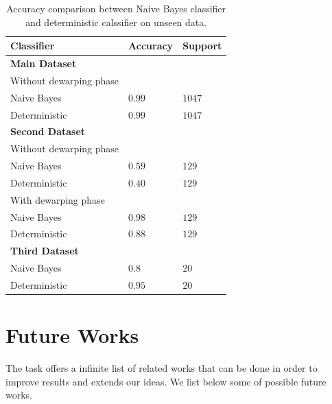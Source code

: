 \documentclass[10pt,twocolumn,letterpaper]{article}
\begin{document}
\begin{table}[!h]
  \begin{center}
    \begin{tabular}{lll}
      \hline
      Classifier & Accuracy & Support \\ \hline
      \textbf{Main Dataset} \\
      \small Without dewarping phase\\
      \; \; Naive Bayes & $0.99$ & $1047$ \\
      \; \; Deterministic & $0.99$ & $1047$ \\ \hline
      
      \textbf{Second Dataset} & & \\
      \small Without dewarping phase \\
      \; \; Naive Bayes & $0.59$ & $129$ \\
      \; \; Deterministic & $0.40$ & $129$ \\ 
      
      \small With dewarping phase \\
      \; \; Naive Bayes & $0.98$ & $129$ \\
      \; \; Deterministic & $0.88$ & $129$ \\ \hline
      
      \textbf{Third Dataset} & & \\
      \; \; Naive Bayes & $0.8$ & $20$ \\
      \; \; Deterministic & $0.95$ & $20$ \\ \hline
    \end{tabular}
  \end{center}
  \label{table:classifiers-comparison}
  \caption{Accuracy comparison between Naive Bayes classifier and
    deterministic calssifier on unseen data.}
\end{table}

\section{Future Works}
\label{sec:future-works}

The task offers a infinite list of related works that can be done in
order to improve results and extends our ideas. We list below some of
possible future works.
\end{document}
